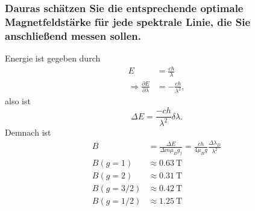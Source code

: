 \subsubsection{Dauras schätzen Sie die entsprechende optimale Magnetfeldstärke für jede spektrale Linie, die Sie anschließend
messen sollen.}
Energie ist gegeben durch 
\begin{align*}
    E&=\frac{ch}{\lambda}\\
    \Rightarrow \frac{\partial E}{\partial\lambda}&=-\frac{ch}{\lambda^2},
\end{align*}
also ist 
\begin{equation*}
    \Delta E= \frac{-ch}{\lambda^2}\delta\lambda .
\end{equation*}
Demnach ist 
\begin{align*}
    B&=\frac{\Delta E}{\Delta m\mu_B g_j}=\frac{ch}{4\mu_Bg}\frac{\Delta\lambda_D}{\lambda^2}\\
    B(g=1)&\approx\SI{0.63}{\tesla}\\
    B(g=2)&\approx\SI{0.31}{\tesla}\\
    B(g=3/2)&\approx\SI{0.42}{\tesla}\\
    B(g=1/2)&\approx\SI{1.25}{\tesla}
\end{align*}